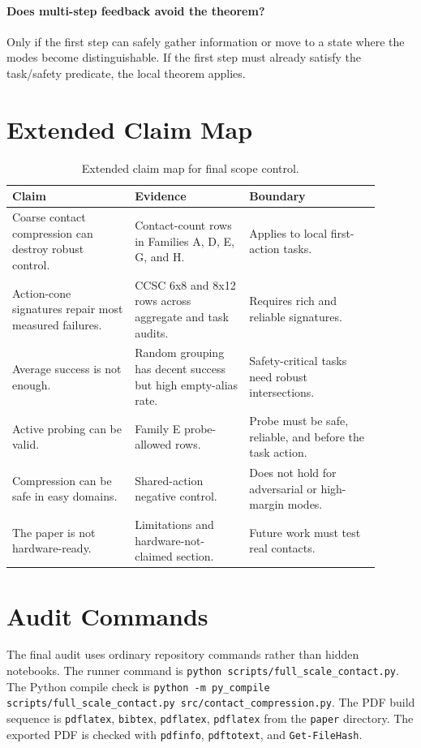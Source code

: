 \documentclass{article}
\begin{document}
\paragraph{Does multi-step feedback avoid the theorem?}
Only if the first step can safely gather information or move to a state where the modes become distinguishable. If the first step must already satisfy the task/safety predicate, the local theorem applies.

\section{Extended Claim Map}
\begin{table}[p]
\centering
\caption{Extended claim map for final scope control.}
\label{tab:extended-claim-map}
\small
\begin{tabular}{p{0.30\linewidth}p{0.28\linewidth}p{0.32\linewidth}}
\toprule
Claim & Evidence & Boundary\\
\midrule
Coarse contact compression can destroy robust control. & Contact-count rows in Families A, D, E, G, and H. & Applies to local first-action tasks.\\
Action-cone signatures repair most measured failures. & CCSC 6x8 and 8x12 rows across aggregate and task audits. & Requires rich and reliable signatures.\\
Average success is not enough. & Random grouping has decent success but high empty-alias rate. & Safety-critical tasks need robust intersections.\\
Active probing can be valid. & Family E probe-allowed rows. & Probe must be safe, reliable, and before the task action.\\
Compression can be safe in easy domains. & Shared-action negative control. & Does not hold for adversarial or high-margin modes.\\
The paper is not hardware-ready. & Limitations and hardware-not-claimed section. & Future work must test real contacts.\\
\bottomrule
\end{tabular}
\end{table}

\section{Audit Commands}
The final audit uses ordinary repository commands rather than hidden notebooks. The runner command is \texttt{python scripts/full\_scale\_contact.py}. The Python compile check is \texttt{python -m py\_compile scripts/full\_scale\_contact.py src/contact\_compression.py}. The PDF build sequence is \texttt{pdflatex}, \texttt{bibtex}, \texttt{pdflatex}, \texttt{pdflatex} from the \texttt{paper} directory. The exported PDF is checked with \texttt{pdfinfo}, \texttt{pdftotext}, and \texttt{Get-FileHash}.
\end{document}
